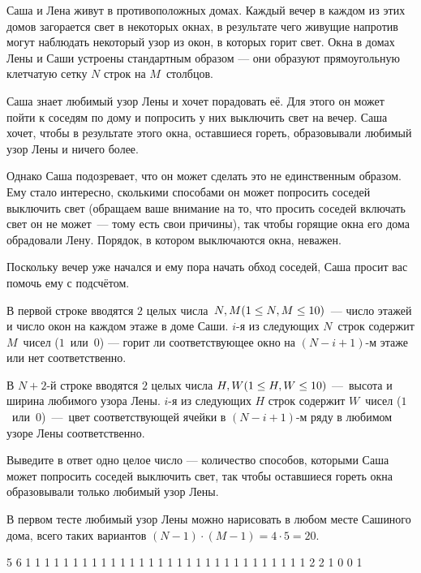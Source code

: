 
Саша и Лена живут в противоположных домах. Каждый вечер в каждом из этих домов загорается свет в некоторых окнах, в результате чего живущие напротив могут наблюдать некоторый узор из окон, в которых горит свет. Окна в домах Лены и Саши устроены стандартным образом — они образуют прямоугольную клетчатую сетку $N$ строк на $M$ столбцов.

Саша знает любимый узор Лены и хочет порадовать её. Для этого он может пойти к соседям по дому и попросить у них выключить свет на вечер. Саша хочет, чтобы в результате этого окна, оставшиеся гореть, образовывали любимый узор Лены и ничего более. 

Однако Саша подозревает, что он может сделать это не единственным образом. Ему стало интересно, сколькими способами он может попросить соседей выключить свет (обращаем ваше внимание на то, что просить соседей включать свет он не может~— тому есть свои причины), так чтобы горящие окна его дома обрадовали Лену. Порядок, в котором выключаются окна, неважен.

Поскольку вечер уже начался и ему пора начать обход соседей, Саша просит вас помочь ему с подсчётом.


В первой строке вводятся $2$ целых числа $N, M \space (1\leq N, M \leq 10)$ — число этажей и число окон на каждом этаже в доме Саши. $i$-я из следующих $N$ строк содержит $M$ чисел ($1$ или~$0$) — горит ли соответствующее окно на $(N-i+1)$-м этаже или нет соответственно.

В $N+2$-й строке вводятся $2$ целых числа $H, W\space(1\leq H,W \leq 10)$ — высота и ширина любимого узора Лены. $i$-я из следующих $H$ строк содержит $W$ чисел ($1$~или~$0$) — цвет соответствующей ячейки в $(N-i+1)$-м ряду в любимом узоре Лены соответственно.

\outputfmtSection

Выведите в ответ одно целое число — количество способов, которыми Саша может попросить соседей выключить свет, так чтобы оставшиеся гореть окна образовывали только любимый узор Лены.

\explanationSection

В первом тесте любимый узор Лены можно нарисовать в любом месте Сашиного дома, всего таких вариантов $(N - 1) \cdot (M - 1) = 4 \cdot 5 = 20$.


\begin{myverbbox}[\small]{\vinput}
    5 6
    1 1 1 1 1 1
    1 1 1 1 1 1
    1 1 1 1 1 1
    1 1 1 1 1 1
    1 1 1 1 1 1
    2 2
    1 0
    0 1
\end{myverbbox}

